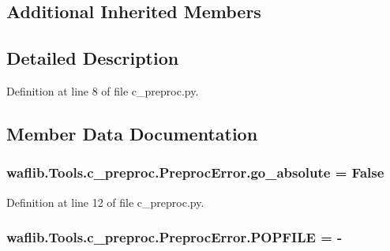 \subsection*{Additional Inherited Members}


\subsection{Detailed Description}


Definition at line 8 of file c\+\_\+preproc.\+py.



\subsection{Member Data Documentation}
\subsubsection[{\texorpdfstring{go\+\_\+absolute}{go_absolute}}]{ waflib.\+Tools.\+c\+\_\+preproc.\+Preproc\+Error.\+go\+\_\+absolute = False\hspace{0.3cm}{\ttfamily [static]}}\hypertarget{classwaflib_1_1_tools_1_1c__preproc_1_1_preproc_error_a0facf8e340b5184bfdc561f822f8b9bd}{}\label{classwaflib_1_1_tools_1_1c__preproc_1_1_preproc_error_a0facf8e340b5184bfdc561f822f8b9bd}


Definition at line 12 of file c\+\_\+preproc.\+py.

\subsubsection[{\texorpdfstring{P\+O\+P\+F\+I\+LE}{POPFILE}}]{ waflib.\+Tools.\+c\+\_\+preproc.\+Preproc\+Error.\+P\+O\+P\+F\+I\+LE = \textquotesingle{}-\/\textquotesingle{}\hspace{0.3cm}{\ttfamily [static]}}\hypertarget{classwaflib_1_1_tools_1_1c__preproc_1_1_preproc_error_a4230017e9053c8c47cd7de4fe72cd914}{}\label{classwaflib_1_1_tools_1_1c__preproc_1_1_preproc_error_a4230017e9053c8c47cd7de4fe72cd914}


